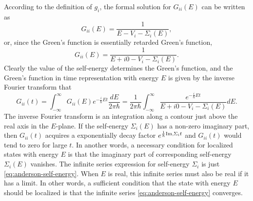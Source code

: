 \documentclass{book}
\renewcommand{\Im}{{\rm Im}}
\numberwithin{equation}{section}
\begin{document}
According to the definition of $g_i$, the formal solution for $G_{ii}(E)$ can be written as
\begin{equation}
  G_{ii}(E)=\frac{1}{E-V_i-\Sigma_i(E)},
\end{equation}
or, since the Green's function is essentially retarded Green's function,
\begin{equation}
  G_{ii}(E)=\frac{1}{E+i0-V_i-\Sigma_i(E)}.
\end{equation}
Clearly the value of the self-energy determines the Green's function,
and the Green's function in time representation with energy $E$ is
given by the inverse Fourier transform that
\begin{equation}
  G_{ii}(t)=\int_{-\infty}^\infty G_{ii}(E)e^{-\frac{i}{\hbar}Et}\frac{dE}{2\pi\hbar}=
  \frac{1}{2\pi\hbar}\int_{-\infty}^\infty\frac{e^{-\frac{i}{\hbar}Et}}{E+i0-V_i-\Sigma_i(E)}dE.
\end{equation}
The inverse Fourier transform is an integration along a contour just
above the real axis in the $E$-plane. If the self-energy $\Sigma_i(E)$
has a non-zero imaginary part, then $G_{ii}(t)$ acquires a
exponentially decay factor $e^{\frac{1}{\hbar}\Im,\Sigma_it}$ and
$G_{ii}(t)$ would tend to zero for large $t$. In another words, a
necessary condition for localized states with energy $E$ is that the
imaginary part of corresponding self-energy $\Sigma_i(E)$ vanishes.
The infinite series expression for self-energy $\Sigma_i$ is just
\eqref{eq:anderson-self-energy}. When $E$ is real, this infinite
series must also be real if it has a limit. In other words, a
sufficient condition that the state with energy $E$ should be
localized is that the infinite series \eqref{eq:anderson-self-energy}
converges.
\end{document}
